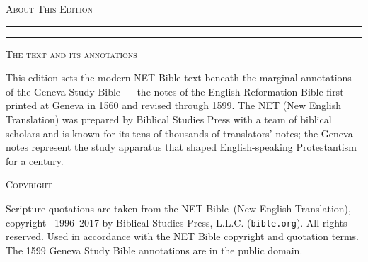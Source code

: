 \clearpage
\thispagestyle{empty}%
\null\vspace*{16mm}
\begin{center}
  {\Large\booktitlefont\scshape About This Edition\par}
  \vspace{3pt}
  {\color{majorprophets!70}\rule{28mm}{0.4pt}\enspace\rule{28mm}{0.4pt}\par}
\end{center}
\vspace{9mm}
\begin{center}\begin{minipage}{0.74\textwidth}
\setlength{\parskip}{6pt plus 2pt}\small

{\booktitlefont\scshape The text and its annotations}\par
This edition sets the modern NET Bible text beneath the marginal annotations of
the Geneva Study Bible --- the notes of the English Reformation Bible first
printed at Geneva in 1560 and revised through 1599. The NET (New English
Translation) was prepared by Biblical Studies Press with a team of biblical
scholars and is known for its tens of thousands of translators' notes; the
Geneva notes represent the study apparatus that shaped English-speaking
Protestantism for a century.

\medskip
{\booktitlefont\scshape Copyright}\par
Scripture quotations are taken from the NET Bible\textregistered\ (New English
Translation), copyright \textcopyright~1996--2017 by Biblical Studies Press,
L.L.C. (\texttt{bible.org}). All rights reserved. Used in accordance with the NET
Bible copyright and quotation terms. The 1599 Geneva Study Bible annotations are
in the public domain.


\end{minipage}\end{center}
\vfill
\clearpage
